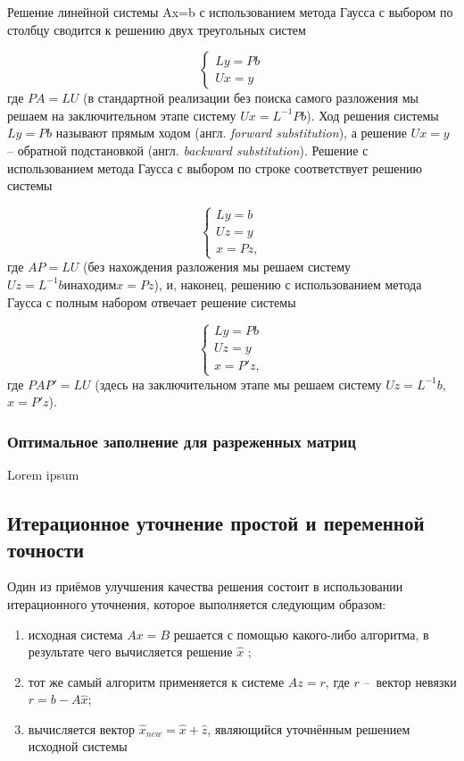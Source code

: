 Решение линейной системы Ax=b с использованием метода Гаусса с выбором по столбцу сводится к решению двух треугольных систем

\[
\begin{cases}
     Ly=Pb   \\
     Ux=y    
\end{cases}
\]
где $PA=LU$ (в стандартной реализации без поиска самого разложения мы решаем на заключительном этапе систему $Ux=L^{-1}Pb$). Ход решения системы $Ly=Pb$ называют прямым ходом (англ. \textit{forward substitution}), а решение $Ux=y$ – обратной подстановкой (англ. \textit{backward substitution}).
Решение с использованием метода Гаусса с выбором по строке соответствует решению системы

\[
\begin{cases}
	Ly = b \\
	Uz = y \\
	x = Pz,
\end{cases}
\] 
где $AP=LU$ (без нахождения разложения мы решаем систему $Uz=L^{-1}b и находим x=Pz$), и, наконец, решению с использованием метода Гаусса с полным набором отвечает решение системы 

\[
\begin{cases}
	Ly = Pb \\
	Uz = y  \\
	x = P'z,
\end{cases}
\] 
где $PAP'=LU$ (здесь на заключительном этапе мы решаем систему $Uz = L^{-1}b$, $x=P'z$). 


\subsubsection{Оптимальное заполнение для разреженных матриц}

Lorem ipsum 


\subsection{Итерационное уточнение простой и переменной точности}

Один из приёмов улучшения качества решения состоит в использовании итерационного уточнения, которое выполняется следующим образом:

\begin{enumerate}
	\item исходная система $Ax=B$ решается с помощью какого-либо алгоритма, в результате чего вычисляется решение $\hat{x}$ ;
	\item тот же самый алгоритм применяется к системе $Az=r$, где $r$ – вектор невязки $r=b-A\hat{x}$;
	\item вычисляется вектор $\hat{x}_{new} = \hat{x} + \hat{z}$, являющийся уточнённым решением исходной системы
\end{enumerate}

